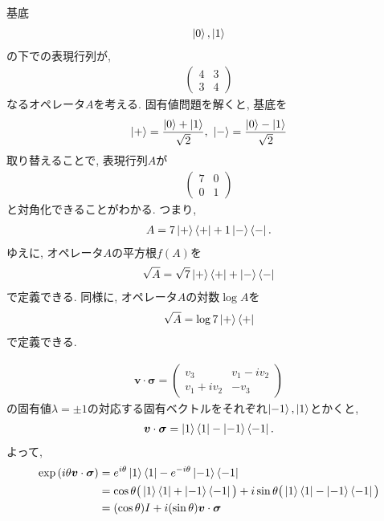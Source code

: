 \begin{ex}
    \label{ex2.34}
    基底
    \begin{align*}
        \ket{0}, \ket{1}
    \end{align*}
    の下での表現行列が,
    \begin{align*}
        \begin{pmatrix}
            4 & 3 \\
            3 & 4
        \end{pmatrix}
    \end{align*}
    なるオペレータ$A$を考える.
    固有値問題を解くと, 基底を
    \begin{align*}
        \ket{+} = \frac{\ket{0}+\ket{1}}{\sqrt{2}},\ \ket{-} = \frac{\ket{0}-\ket{1}}{\sqrt{2}}
    \end{align*}
    取り替えることで, 表現行列$A$が
    \begin{align*}
        \begin{pmatrix}
            7 & 0 \\
            0 & 1
        \end{pmatrix}
    \end{align*}
    と対角化できることがわかる. つまり,
    \begin{align*}
        A = 7 \ket{+}\bra{+} + 1 \ket{-}\bra{-} .
    \end{align*}
    ゆえに, オペレータ$A$の平方根$f(A)$を
    \begin{align*}
        \sqrt{A} = \sqrt{7} \ket{+}\bra{+} +  \ket{-}\bra{-}
    \end{align*}
    で定義できる. 同様に, オペレータ$A$の対数$\log{A}$を
    \begin{align*}
        \sqrt{A} = \log{7} \ket{+}\bra{+}
    \end{align*}
    で定義できる.
\end{ex}

\begin{ex}
    \label{ex2.35}
    \begin{align*}
        \bm{v} \cdot \bm{\sigma}
        =
        \begin{pmatrix}
            v_3         & v_1 - i v_2 \\
            v_1 + i v_2 & - v_3
        \end{pmatrix}
    \end{align*}
    の固有値$\lambda = \pm 1$の対応する固有ベクトルをそれぞれ$\ket{-1}, \ket{1}$とかくと,
    \begin{align*}
        \bm{v} \cdot \bm{\sigma} = \ket{1}\bra{1} - \ket{-1}\bra{-1} .
    \end{align*}
    よって,
    \begin{align*}
        \exp{\left( i \theta \bm{v} \cdot \bm{\sigma} \right)}
         & =
        e^{i \theta} \ket{1}\bra{1} - e^{- i \theta} \ket{-1}\bra{-1} \\
         & =
        \cos{\theta} \big(\ket{1}\bra{1} + \ket{-1}\bra{-1} \big)
        + i \sin{\theta} \big(\ket{1}\bra{1} - \ket{-1}\bra{-1} \big)
        \\
         & =
        (\cos{\theta}) I + i (\sin{\theta}) \bm{v} \cdot \bm{\sigma}
    \end{align*}
\end{ex}

